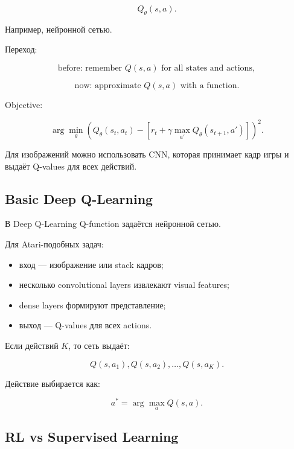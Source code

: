 \documentclass[a4paper,12pt]{article}
\begin{document}
\[
Q_\theta(s,a).
\]

Например, нейронной сетью.

Переход:

\[
\text{before: remember } Q(s,a) \text{ for all states and actions},
\]

\[
\text{now: approximate } Q(s,a) \text{ with a function}.
\]

Objective:

\[
\arg\min_\theta
\left(
Q_\theta(s_t,a_t)
-
\left[
r_t + \gamma \max_{a'}Q_\theta(s_{t+1},a')
\right]
\right)^2.
\]

Для изображений можно использовать CNN, которая принимает кадр игры и выдаёт Q-values для всех действий.

\subsection{Basic Deep Q-Learning}

В Deep Q-Learning Q-function задаётся нейронной сетью.

Для Atari-подобных задач:

\begin{itemize}
    \item вход --- изображение или stack кадров;
    \item несколько convolutional layers извлекают visual features;
    \item dense layers формируют представление;
    \item выход --- Q-values для всех actions.
\end{itemize}

Если действий \(K\), то сеть выдаёт:

\[
Q(s,a_1), Q(s,a_2), \dots, Q(s,a_K).
\]

Действие выбирается как:

\[
a^*
=
\arg\max_a Q(s,a).
\]

\subsection{RL vs Supervised Learning}
\end{document}
